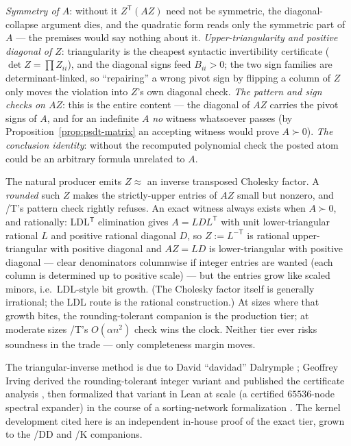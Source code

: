 \begin{bremark}
\emph{Symmetry of $A$}: without it $Z^{\mathsf T}(AZ)$ need not be
symmetric, the diagonal-collapse argument dies, and the quadratic form
reads only the symmetric part of $A$ --- the premises would say nothing
about it. \emph{Upper-triangularity and positive diagonal of $Z$}:
triangularity is the cheapest syntactic invertibility certificate
($\det Z = \prod Z_{ii}$), and the diagonal signs feed
$B_{ii} > 0$; the two sign families are determinant-linked, so
``repairing'' a wrong pivot sign by flipping a column of $Z$ only moves
the violation into $Z$'s own diagonal check. \emph{The pattern and sign
checks on $AZ$}: this is the entire content --- the diagonal of $AZ$
carries the pivot signs of $A$, and for an indefinite $A$ \emph{no}
witness whatsoever passes (by Proposition~\ref{prop:psdt-matrix} an
accepting witness would prove $A \succ 0$). \emph{The conclusion
identity}: without the recomputed polynomial check the posted atom
could be an arbitrary formula unrelated to $A$.
\end{bremark}

\begin{bremark}
The natural producer emits $Z \approx$ an inverse transposed Cholesky
factor. A \emph{rounded} such $Z$ makes the strictly-upper entries of
$AZ$ small but nonzero, and /T's pattern check rightly refuses. An
exact witness always exists when $A \succ 0$, and rationally: LDL$^{\mathsf T}$
elimination gives $A = L D L^{\mathsf T}$ with unit lower-triangular
rational $L$ and positive rational diagonal $D$, so
$Z := L^{-\mathsf T}$ is rational upper-triangular with positive
diagonal and $A Z = L D$ is lower-triangular with positive diagonal
--- clear denominators columnwise if integer entries are wanted (each
column is determined up to positive scale) --- but the entries grow
like scaled minors, i.e.\ LDL-style bit growth. (The Cholesky factor
itself is generally irrational; the LDL route is the rational
construction.) At sizes where that growth
bites, the rounding-tolerant companion  is the
production tier; at moderate sizes /T's $O(\alpha n^2)$ check wins the
clock. Neither tier ever risks soundness in the trade --- only
completeness margin moves.
\end{bremark}

\begin{bremark}[provenance]
The triangular-inverse method is due to David ``davidad'' Dalrymple
\cite{dalrymple2026psd}; Geoffrey Irving derived the rounding-tolerant
integer variant and published the certificate analysis
\cite{irving2026certificate}, then formalized that variant in Lean at
scale (a certified $65536$-node spectral expander) in the course of a
sorting-network formalization \cite{irvingaks}. The kernel development
cited here is an independent in-house proof of the exact tier, grown to
the /DD and /K companions.
\end{bremark}

